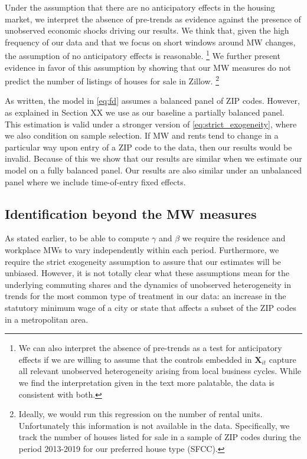 Under the assumption that there are no anticipatory effects in the housing 
market, we interpret the absence of pre-trends as evidence against the presence 
of unobserved economic shocks driving our results.
We think that, given the high frequency of our data and that we focus on short 
windows around MW changes, the assumption of no anticipatory effects is 
reasonable.%
\footnote{We can also interpret the absence of pre-trends as a test for 
anticipatory effects if we are willing to assume that the controls embedded in 
$\mathbf{X}_{it}$ capture all relevant unobserved heterogeneity arising from 
local business cycles.
While we find the interpretation given in the text more palatable, the data is 
consistent with both.}
We further present evidence in favor of this assumption by showing that our MW 
measures do not predict the number of listings of houses for sale in Zillow.%
\footnote{Ideally, we would run this regression on the number of rental units.
Unfortunately this information is not available in the data.
Specifically, we track the number of houses listed for sale in a sample of ZIP 
codes during the period 2013-2019 for our preferred house type (SFCC).}

As written, the model in \eqref{eq:fd} assumes a balanced panel of ZIP codes.
However, as explained in Section XX   %
we use as our baseline a partially balanced panel.
This estimation is valid under a stronger version of 
\eqref{eq:strict_exogeneity}, where we also condition on sample selection.
If MW and rents tend to change in a particular way upon entry of a ZIP code to 
the data, then our results would be invalid.
Because of this we show that our results are similar when we estimate our model
on a fully balanced panel.
Our results are also similar under an unbalanced panel where we include 
time-of-entry fixed effects.

\subsection{Identification beyond the MW measures}

As stated earlier, to be able to compute $\gamma$ and $\beta$ we require the 
residence and workplace MWs to vary independently within each period.
Furthermore, we require the strict exogeneity assumption to assure that our
estimates will be unbiased.
However, it is not totally clear what these assumptions mean for the underlying 
commuting shares and the dynamics of unobserved heterogeneity in trends for the 
most common type of treatment in our data: 
an increase in the statutory minimum wage of a city or state that affects 
a subset of the ZIP codes in a metropolitan area.

